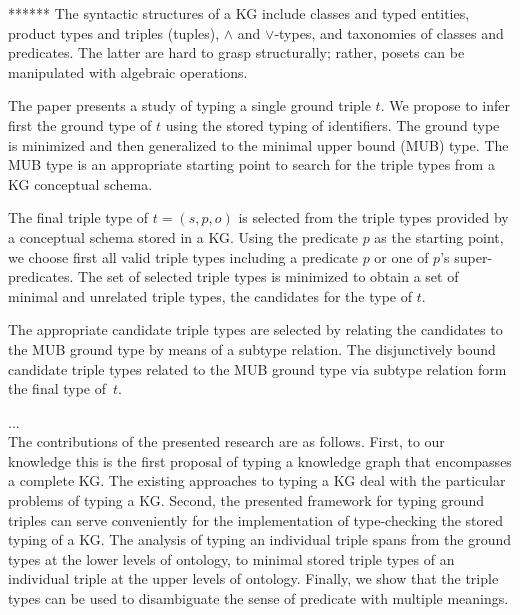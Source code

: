 \documentclass[runningheads]{llncs}
\begin{document}
****** The syntactic structures of a KG include classes and typed
entities, product types and triples (tuples), $\land$ and $\lor$-types,
and taxonomies of classes and predicates. The latter are hard to grasp
structurally; rather, posets can be manipulated with algebraic
operations.

The paper presents a study of typing a single ground triple $t$. We
propose to infer first the ground type of $t$ using the stored typing
of identifiers. The ground type is minimized and then generalized to
the minimal upper bound (MUB) type. The MUB type is an appropriate
starting point to search for the triple types from a KG conceptual
schema.

The final triple type of $t=(s,p,o)$ is selected from the triple types
provided by a conceptual schema stored in a KG. Using the predicate
$p$ as the starting point, we choose first all valid triple types
including a predicate $p$ or one of $p$'s super-predicates. The set of
selected triple types is minimized to obtain a set of minimal and
unrelated triple types, the candidates for the type of $t$.

The appropriate candidate triple types are selected by relating the
candidates to the MUB ground type by means of a subtype relation. The
disjunctively bound candidate triple types related to the MUB ground
type via subtype relation form the final type of~$t$.

... \\

The contributions of the presented research are as follows. First, to
our knowledge this is the first proposal of typing a knowledge graph
that encompasses a complete KG. The existing approaches to typing a KG
deal with the particular problems of typing a KG. Second, the
presented framework for typing ground triples can serve conveniently
for the implementation of type-checking the stored typing of a KG. The
analysis of typing an individual triple spans from the ground types at
the lower levels of ontology, to minimal stored triple types of an
individual triple at the upper levels of ontology. Finally, we show
that the triple types can be used to disambiguate the sense of
predicate with multiple meanings.
\end{document}
